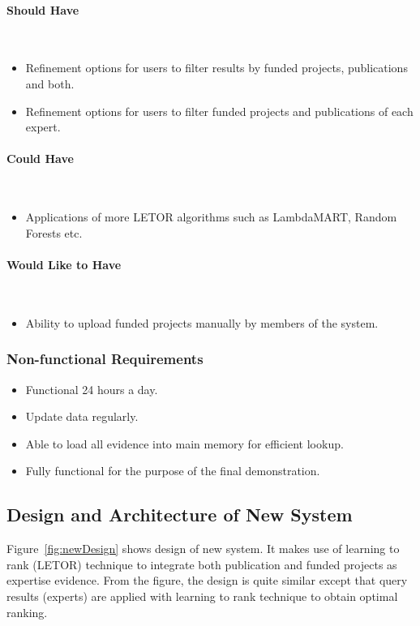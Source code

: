 \paragraph{Should Have} \hspace{0pt} \\
\begin{itemize}
 \item Refinement options for users to filter results by funded projects, publications and both.
 \item Refinement options for users to filter funded projects and publications of each expert.
\end{itemize}

\paragraph{Could Have} \hspace{0pt} \\
\begin{itemize}
 \item Applications of more LETOR algorithms such as LambdaMART, Random Forests etc.
\end{itemize}

\paragraph{Would Like to Have} \hspace{0pt} \\
\begin{itemize}
 \item Ability to upload funded projects manually by members of the system.
\end{itemize}

\subsubsection{Non-functional Requirements}
\begin{itemize}
 \item Functional 24 hours a day.
 \item Update data regularly.
 \item Able to load all evidence into main memory for efficient lookup.
 \item Fully functional for the purpose of the final demonstration.
\end{itemize}

\subsection{Design and Architecture of New System} \label{section:union}
Figure~\ref{fig:newDesign} shows design of new system. It makes use of learning to rank (LETOR) technique to integrate 
both publication and funded projects as expertise evidence. From the figure, the design is quite similar except that query results (experts) are
applied with learning to rank technique to obtain optimal ranking.

